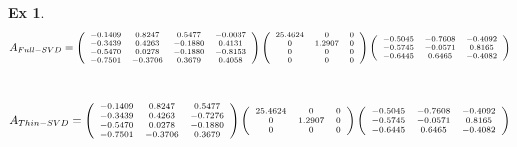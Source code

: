\documentclass[12pt, oneside]{article}
\newtheorem{exercise}{Ex}
\begin{document}
  \begin{exercise}
	\begin{equation*}
	  \scriptsize
	  A_{Full-SVD} = 
	  \left( 
	  \begin{array}{cccc}
		-0.1409 & 0.8247 & 0.5477 & -0.0037 \\
		-0.3439 & 0.4263 & -0.1880 & 0.4131 \\
		-0.5470 & 0.0278 & -0.1880 & -0.8153 \\
		-0.7501 & -0.3706 & 0.3679 & 0.4058 \\
	  \end{array}
	  \right)
	  \left( 
	  \begin{array}{ccc}
		25.4624 & 0 & 0 \\
		0 & 1.2907 & 0 \\
		0 & 0 & 0 \\
		0 & 0 & 0 \\
	  \end{array}
	  \right)
	  \left( 
	  \begin{array}{ccc}
		-0.5045 & -0.7608 & -0.4092 \\
		-0.5745 & -0.0571 & 0.8165 \\
		-0.6445 & 0.6465 & -0.4082 \\
	  \end{array}
	  \right)
	\end{equation*} \\	
	\begin{equation*}
	  \scriptsize
	  A_{Thin-SVD} = 
	  \left( 
	  \begin{array}{ccc}
		-0.1409 & 0.8247 & 0.5477 \\
		-0.3439 & 0.4263 & -0.7276 \\
		-0.5470 & 0.0278 & -0.1880 \\
		-0.7501 & -0.3706 & 0.3679 \\
	  \end{array}
	  \right)
	  \left( 
	  \begin{array}{ccc}
		25.4624 & 0 & 0 \\
		0 & 1.2907 & 0 \\
		0 & 0 & 0 \\
	  \end{array}
	  \right)
	  \left( 
	  \begin{array}{ccc}
		-0.5045 & -0.7608 & -0.4092 \\
		-0.5745 & -0.0571 & 0.8165 \\
		-0.6445 & 0.6465 & -0.4082 \\
	  \end{array}
	  \right)
	\end{equation*}
  \end{exercise}
\end{document}
